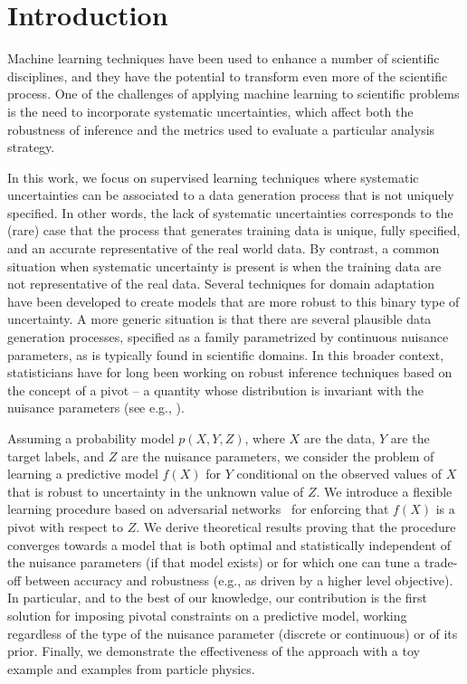 \documentclass{article}
\theoremstyle{plain}
\begin{document}

\section{Introduction}

Machine learning techniques have been used to enhance a number of scientific
disciplines, and they have the potential to transform even more of the
scientific process. One of the challenges of applying machine learning
to scientific problems is the need to incorporate systematic
uncertainties, which affect both the
robustness of inference and the metrics used to evaluate a
particular analysis strategy.

In this work, we focus on supervised learning techniques where
systematic uncertainties can be associated to a data generation
process that is not uniquely specified. In other words, the lack of systematic
uncertainties corresponds to the (rare) case that the process that generates
training data is unique, fully specified, and an accurate representative of the
real world data. By contrast, a common situation when systematic uncertainty is
present is when the training data are not representative of the real data.
Several techniques for domain
adaptation have been developed to create models that are more robust
to this binary type of uncertainty.
A more generic situation is that there are several
plausible data generation processes, specified as a family
parametrized by continuous nuisance parameters, as is typically found in scientific domains.
In this broader context, statisticians have for long been working on robust inference techniques
based on the concept of a pivot -- a quantity whose distribution is invariant
with the nuisance parameters (see e.g., \citep{degroot1986probability}).

Assuming a probability model $p(X,Y,Z)$, where $X$ are the data, $Y$ are the
target labels, and $Z$ are the nuisance parameters, we consider the problem of
learning a predictive model $f(X)$ for $Y$ conditional on the observed values of $X$
that is robust to uncertainty in the unknown value of $Z$. We
introduce a flexible learning procedure based on adversarial networks~\citep{goodfellow2014generative}
for enforcing that  $f(X)$ is a pivot with respect to $Z$.
We derive theoretical results proving that the procedure
converges towards a model that is both optimal and statistically independent of the
nuisance parameters (if that model exists) or for which one can tune a
trade-off between accuracy and robustness (e.g., as driven by a higher level objective).
In particular, and to the best of our knowledge, our contribution is the first
solution for imposing pivotal constraints on a predictive model,
working regardless of the type of
the nuisance parameter (discrete or continuous) or of its prior.
Finally, we demonstrate the
effectiveness of the approach with a toy example and examples from particle physics.
\end{document}

